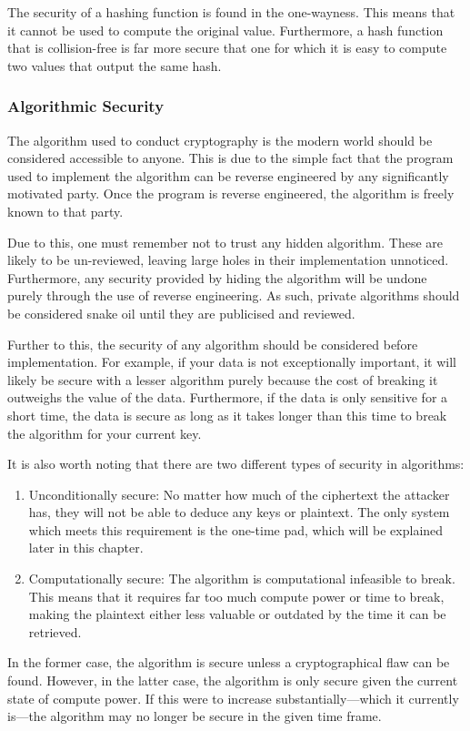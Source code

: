 				The security of a hashing function is found in the one-wayness. 
				This means that it cannot be used to compute the original value. 
				Furthermore, a hash function that is collision-free is far more secure that one for which it is easy to compute two values that output the same hash. 

			\subsubsection{Algorithmic Security}
				The algorithm used to conduct cryptography is the modern world should be considered accessible to anyone. 
				This is due to the simple fact that the program used to implement the algorithm can be reverse engineered by any significantly motivated party. 
				Once the program is reverse engineered, the algorithm is freely known to that party. 

				Due to this, one must remember not to trust any hidden algorithm. 
				These are likely to be un-reviewed, leaving large holes in their implementation unnoticed. 
				Furthermore, any security provided by hiding the algorithm will be undone purely through the use of reverse engineering. 
				As such, private algorithms should be considered snake oil until they are publicised and reviewed. 

				Further to this, the security of any algorithm should be considered before implementation. 
				For example, if your data is not exceptionally important, it will likely be secure with a lesser algorithm purely because the cost of breaking it outweighs the value of the data. 
				Furthermore, if the data is only sensitive for a short time, the data is secure as long as it takes longer than this time to break the algorithm for your current key. 

				It is also worth noting that there are two different types of security in algorithms:
				\begin{enumerate}
					\item Unconditionally secure: No matter how much of the ciphertext the attacker has, they will not be able to deduce any keys or plaintext. 
						The only system which meets this requirement is the one-time pad, which will be explained later in this chapter. 
					\item Computationally secure: The algorithm is computational infeasible to break. 
						This means that it requires far too much compute power or time to break, making the plaintext either less valuable or outdated by the time it can be retrieved. 
				\end{enumerate}
				In the former case, the algorithm is secure unless a cryptographical flaw can be found. 
				However, in the latter case, the algorithm is only secure given the current state of compute power. 
				If this were to increase substantially---which it currently is---the algorithm may no longer be secure in the given time frame. 

